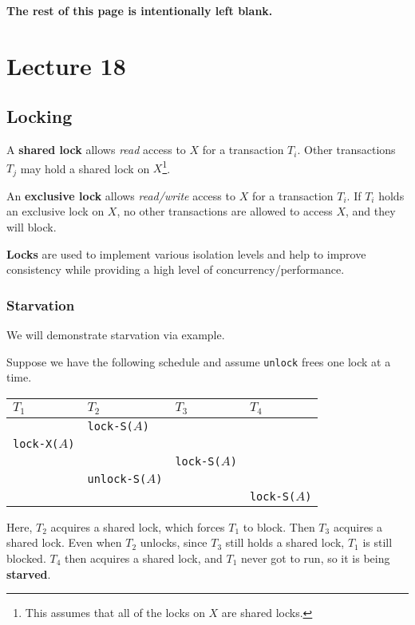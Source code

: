 \documentclass{report}
\newenvironment{definition}[1]{\begin{tcolorbox}[title={Definition: #1}]}{\end{tcolorbox}}
\newenvironment{example}{\begin{tcolorbox}[title={Example},colback=green!5!white,colframe=black!75!green]}{\end{tcolorbox}}
\renewcommand{\bf}[1]{\textbf{{#1}}}
\renewcommand{\tt}[1]{\texttt{{#1}}}
\renewcommand{\it}[1]{\textit{{#1}}}
\begin{document}
\begin{center}
    \bf{The rest of this page is intentionally left blank.}
\end{center}

\chapter{Lecture 18}
\section{Locking}
\begin{definition}{Shared and Exclusive Lock}
    A \bf{shared lock} allows \it{read} access to $X$ for a transaction $T_i$. Other
    transactions $T_j$ may hold a shared lock on $X$\footnote{This assumes that
    all of the locks on $X$ are shared locks.}.
    \vspace{1em}

    An \bf{exclusive lock} allows \it{read/write} access to $X$ for a
    transaction $T_i$. If $T_i$ holds an exclusive lock on $X$, no other
    transactions are allowed to access $X$, and they will block.
\end{definition}

\bf{Locks} are used to implement various isolation levels and help to improve
consistency while providing a high level of concurrency/performance.

\subsection{Starvation}
We will demonstrate starvation via example.
\begin{example}
    Suppose we have the following schedule and assume \tt{unlock} frees one
    lock at a time.

    {
        \centering
        \begin{tabular}{l|l|l|l}
            $T_1$ & $T_2$ & $T_3$ & $T_4$ \\
            \hline
                  & \tt{lock-S($A$)} & & \\
            \tt{lock-X($A$)} & & & \\
                           & & \tt{lock-S($A$)} & \\
                           & \tt{unlock-S($A$)} & & \\
                           & & & \tt{lock-S($A$)} \\
        \end{tabular}
        \par
    }
    Here, $T_2$ acquires a shared lock, which forces $T_1$ to block. Then $T_3$
    acquires a shared lock. Even when $T_2$ unlocks, since $T_3$ still holds a
    shared lock, $T_1$ is still blocked. $T_4$ then acquires a shared lock, and
    $T_1$ never got to run, so it is being \bf{starved}.
\end{example}
\end{document}
